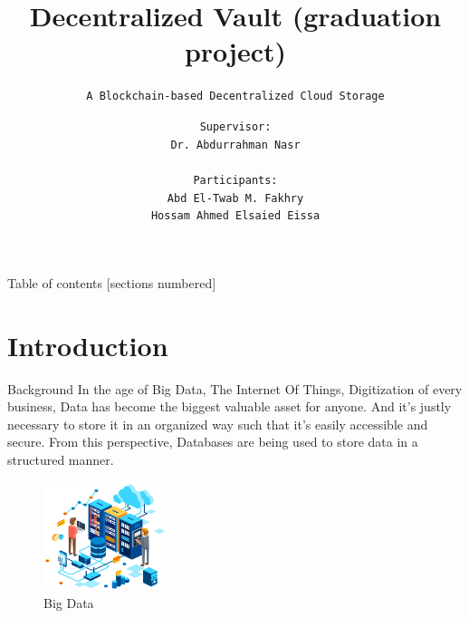 \documentclass[aspectratio=169,usenames,dvipsnames,pdftex]{beamer}
\title{Decentralized Vault (graduation project)}
\subtitle{\texttt{A Blockchain-based Decentralized Cloud Storage}}
\date {}
\author {
  \texttt{Supervisor:} \\
  \texttt{\large{Dr. Abdurrahman Nasr}} \\
  \\
  \texttt{Participants:} \\
  \texttt{\large{Abd El-Twab M. Fakhry}} \\
  \texttt{\large{Hossam Ahmed Elsaied Eissa}}
}
\institute {
  \centering
  Al-Azhar University \\
  Faculty of Engineering \\
  Computers \& Systems Engineering Department \\\vspace{8pt}
  \today
}
\begin{document}
	\maketitle

	\begin{frame}{Table of contents}
		[sections numbered]
		\tableofcontents[hideallsubsections]
	\end{frame}

  \section{{Introduction}}

  \begin{frame}[t]{Background}\vspace{8pt}
    In the age of Big Data, The Internet Of Things, Digitization of every business, Data has become the biggest valuable asset for anyone.
    And it’s justly necessary to store it in an organized way such that it’s easily accessible and secure.
    From this perspective, Databases are being used to store data in a structured manner.

    \begin{figure}
      \includegraphics[width=0.32\textwidth]{big-data.png}\vspace{-8pt}
      \caption{Big Data}
    \end{figure}
  \end{frame}
\end{document}
